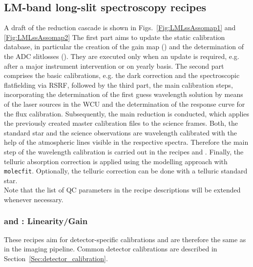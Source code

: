 \clearpage
\subsection{LM-band long-slit spectroscopy recipes}
\label{ssec:recipes_lss_lm}

A draft of the reduction cascade is shown in
Figs.~\ref{Fig:LMLssAssomap1} and \ref{Fig:LMLssAssomap2}%
The first part aims to update the static calibration database, in particular the creation of the gain map () and the determination of the \ac{ADC} slitlosses (). They are executed only when an update is required, e.g. after a major instrument intervention or on yearly basis. The second part comprises the basic calibrations, e.g. the dark correction and the spectroscopic flatfielding via \ac{RSRF}, followed by the third part, the main calibration steps, incorporating the determination of the first guess wavelength solution by means of the laser sources in the \ac{WCU} and the determination of the response curve for the flux calibration. Subsequently, the main reduction is conducted, which applies the previously created master calibration files to the science frames. Both, the standard star and the science observations are wavelength calibrated with the help of the atmospheric lines visible in the respective spectra. Therefore the main step of the wavelength calibration is carried out in the recipes  and . Finally, the telluric absorption correction is applied using the modelling approach with \texttt{molecfit}. Optionally, the telluric correction can be done with a telluric standard star.\\
Note that the list of \ac{QC} parameters in the recipe descriptions will be extended whenever necessary.\\

\subsubsection{ and : Linearity/Gain}
These recipes aim for detector-specific calibrations and are therefore the same as in the imaging pipeline. Common detector calibrations are described in Section~\ref{Sec:detector_calibration}.

